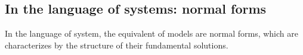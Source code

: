 \begin{comment}
  \begin{proof}
    See \TODO{}
  \end{proof}
\end{comment}
\begin{comment}
  \begin{prop}
    \marginnote{This condition \textbf{might be} equivalent to the
      condition of being \textbf{nice} in~\cite{thboalch}.}
    Let $(\cM,\nabla)$ be a germ, equipped with a basis in which the matrix $A$
    takes the form
    \[
      A=t^{-r}A(t)
    \]
    with
    \begin{itemize}
      \item $r\geq1$,
      \item $A$ has holomorphic entries, and
      \item $A_0:=A(0)$ being regular semisimple, i.e.\ with pairwise distinct
        eigenvalues.
    \end{itemize}
    Then there is no ramification needed, to apply the Levelt-Turittin-theorem.
    \comm{Further, all the summands $\cR_\phi$ have rank one, which is not the
    case in general.}
  \end{prop}
  \begin{proof}
    See~\cite[Thm.II.5.7]{sabbah2007isomonodromic}.
  \end{proof}
\end{comment}

\subsection{In the language of systems: normal forms}
In the language of system, the equivalent of models are normal forms, which are
characterizes by the structure of their fundamental solutions.

